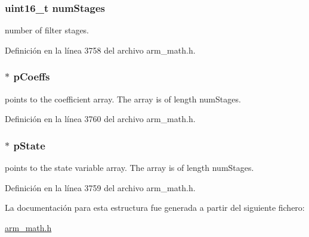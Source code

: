 \subsubsection[{\texorpdfstring{num\+Stages}{numStages}}]{\setlength{\rightskip}{0pt plus 5cm}uint16\+\_\+t num\+Stages}\hypertarget{structarm__fir__lattice__instance__f32_a4cceb90547b3e585d4c7aabaa8057212}{}\label{structarm__fir__lattice__instance__f32_a4cceb90547b3e585d4c7aabaa8057212}
number of filter stages. 

Definición en la línea 3758 del archivo arm\+\_\+math.\+h.

\subsubsection[{\texorpdfstring{p\+Coeffs}{pCoeffs}}]{$\ast$ p\+Coeffs}\hypertarget{structarm__fir__lattice__instance__f32_aacbb8dd8eeba4b21fc2bb40076405ee3}{}\label{structarm__fir__lattice__instance__f32_aacbb8dd8eeba4b21fc2bb40076405ee3}
points to the coefficient array. The array is of length num\+Stages. 

Definición en la línea 3760 del archivo arm\+\_\+math.\+h.

\subsubsection[{\texorpdfstring{p\+State}{pState}}]{$\ast$ p\+State}\hypertarget{structarm__fir__lattice__instance__f32_a335c87e6fdc4b96601d95a5de8b9c463}{}\label{structarm__fir__lattice__instance__f32_a335c87e6fdc4b96601d95a5de8b9c463}
points to the state variable array. The array is of length num\+Stages. 

Definición en la línea 3759 del archivo arm\+\_\+math.\+h.



La documentación para esta estructura fue generada a partir del siguiente fichero\+:\begin{DoxyCompactItemize}
\item 
\hyperlink{arm__math_8h}{arm\+\_\+math.\+h}\end{DoxyCompactItemize}
